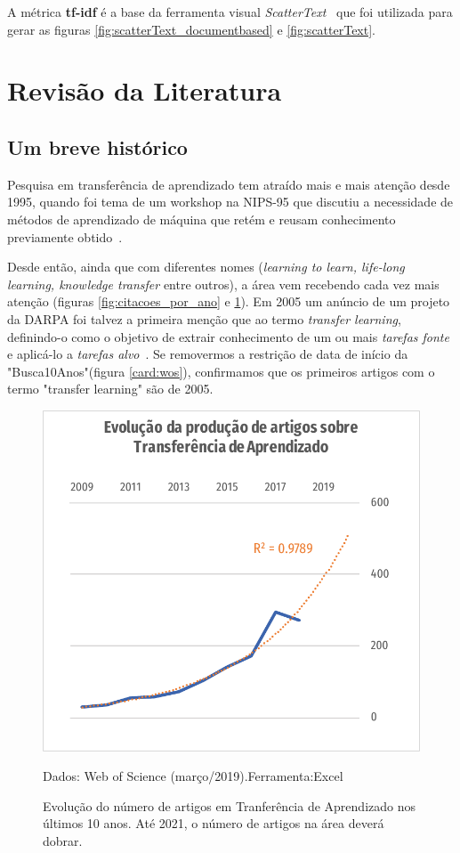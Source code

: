 \documentclass[sigconf]{acmart}
\newcommand{\source}[2]{\raggedleft{}\vspace*{-7mm}\caption*{ \textmd{\scriptsize{Dados: {#1}.\hfill Ferramenta:{#2}}}}}
\begin{document}
\begin{enumerate}[a)]
{  A métrica \textbf{tf-idf} é a base da ferramenta visual \emph{ScatterText}~\cite{kessler2017scattertext} que foi utilizada para gerar as figuras \ref{fig:scatterText_documentbased} e \ref{fig:scatterText}.

  }\label{analiseTextual}
\end{enumerate}



\section{Revisão da Literatura}\label{literatura}
  \subsection{Um breve histórico}
  Pesquisa em transferência de aprendizado tem atraído mais e mais atenção desde 1995, quando foi tema de  um workshop na NIPS-95 que discutiu a necessidade de métodos de aprendizado de máquina que retém e reusam conhecimento previamente obtido~\cite{PanYang}. 
  
  Desde então, ainda que com diferentes nomes (\emph{learning to learn, life-long learning, knowledge transfer} entre outros), a área vem recebendo cada vez mais atenção (figuras \ref{fig:citacoes_por_ano} e \ref{fig:artigos_por_ano}). Em 2005 um anúncio de um projeto da DARPA foi talvez a primeira menção que ao termo \emph{transfer learning}, definindo-o como o objetivo de extrair conhecimento de um ou mais \emph{tarefas fonte} e aplicá-lo a \emph{tarefas alvo}~\cite{PanYang}. Se removermos a restrição de data de início da "Busca10Anos"(figura \ref{card:wos}), confirmamos que os primeiros artigos com o termo "transfer learning" são de 2005.

  \begin{figure}[h]
    \includegraphics[width=\columnwidth]{artigos_por_ano}
    \source{Web of Science (março/2019)}{Excel}
    \caption{Evolução do número de artigos em Tranferência de Aprendizado nos últimos 10 anos. Até 2021, o número de artigos na área deverá dobrar.}
    \label{fig:artigos_por_ano}
  \end{figure}
\end{document}
